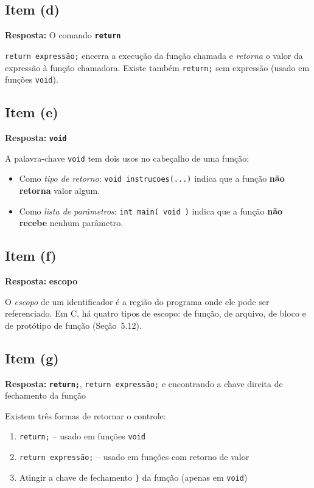 \documentclass[12pt,a4paper]{article}
\begin{document}
\subsection*{Item (d)}
\begin{respostabox}
\textbf{Resposta:} O comando \textcolor{deitelblue}{\textbf{\texttt{return}}}

\texttt{return expressão;} encerra a execução da função chamada e \textit{retorna}
o valor da expressão à função chamadora. Existe também \texttt{return;} sem expressão
(usado em funções \texttt{void}).
\end{respostabox}

\subsection*{Item (e)}
\begin{respostabox}
\textbf{Resposta:} \textcolor{deitelblue}{\textbf{\texttt{void}}}

A palavra-chave \texttt{void} tem dois usos no cabeçalho de uma função:
\begin{itemize}[noitemsep]
  \item Como \textit{tipo de retorno}: \texttt{void instrucoes(...)} indica que a
  função \textbf{não retorna} valor algum.
  \item Como \textit{lista de parâmetros}: \texttt{int main( void )} indica que a
  função \textbf{não recebe} nenhum parâmetro.
\end{itemize}
\end{respostabox}

\subsection*{Item (f)}
\begin{respostabox}
\textbf{Resposta:} \textcolor{deitelblue}{\textbf{escopo}}

O \textit{escopo} de um identificador é a região do programa onde ele pode ser
referenciado. Em C, há quatro tipos de escopo: de função, de arquivo, de bloco e
de protótipo de função (Seção~5.12).
\end{respostabox}

\subsection*{Item (g)}
\begin{respostabox}
\textbf{Resposta:} \textcolor{deitelblue}{\textbf{\texttt{return;}}, \texttt{return expressão;} e encontrando a chave direita de fechamento da função}

Existem três formas de retornar o controle:
\begin{enumerate}[noitemsep]
  \item \texttt{return;} -- usado em funções \texttt{void}
  \item \texttt{return expressão;} -- usado em funções com retorno de valor
  \item Atingir a chave de fechamento \texttt{\}} da função (apenas em \texttt{void})
\end{enumerate}
\end{respostabox}
\end{document}
